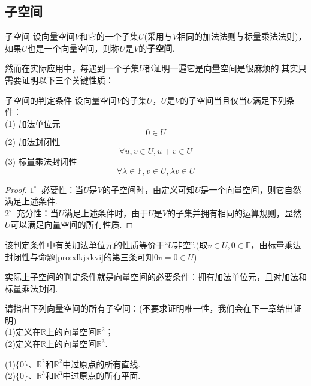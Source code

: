 \documentclass[lang=cn, zihao=5]{elegantbook}
\newcommand{\R}{\mathbb{R}}
\newcommand{\F}{\mathbb{F}}
\newcommand{\buzhou}[1]{$#1^{\circ} \ $}
\begin{document}
\subsection{子空间}

\begin{definition}{子空间}
    设向量空间$V$和它的一个子集$U$(采用与$V$相同的加法法则与标量乘法法则)，如果$U$也是一个向量空间，则称$U$是$V$的\textbf{子空间}.
\end{definition}

然而在实际应用中，每遇到一个子集$U$都证明一遍它是向量空间是很麻烦的.其实只需要证明以下三个关键性质：

\begin{proposition}{子空间的判定条件}
    设向量空间$V$的子集$U$，$U$是$V$的子空间当且仅当$U$满足下列条件： \\
    (1) 加法单位元$$0 \in U$$
    (2) 加法封闭性$$\forall u,v \in U, u+v \in U$$
    (3) 标量乘法封闭性$$\forall \lambda \in \F,v \in U,\lambda v \in U$$
\end{proposition}
\begin{proof}
    \buzhou{1} 必要性：当$U$是$V$的子空间时，由定义可知$U$是一个向量空间，则它自然满足上述条件. \\
    \buzhou{2} 充分性：当$U$满足上述条件时，由于$U$是$V$的子集并拥有相同的运算规则，显然$U$可以满足向量空间的所有性质.
\end{proof}
\begin{remark}
    该判定条件中有关加法单位元的性质等价于“$U$非空”.(取$v \in U,0 \in \F$，由标量乘法封闭性与命题\ref{pro:xlkjxkvi}的第三条可知$0v=0 \in U$)
\end{remark}
\begin{remark}
    实际上子空间的判定条件就是向量空间的必要条件：拥有加法单位元，且对加法和标量乘法封闭.
\end{remark}

\begin{example}
    请指出下列向量空间的所有子空间：(不要求证明唯一性，我们会在下一章给出证明) \\
    (1)定义在$\R$上的向量空间$\R ^{2}$； \\
    (2)定义在$\R$上的向量空间$\R ^{3}$.
\end{example}
\begin{solution}
    (1)$\{ 0 \}$、$\R ^2$和$\R ^2$中过原点的所有直线. \\
    (2)$\{ 0 \}$、$\R ^3$和$\R ^3$中过原点的所有平面. 
\end{solution}
\end{document}

